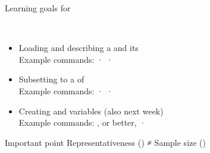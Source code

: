 \documentclass[t]{beamer}
\begin{document}
   \begin{frame}[t]{Learning goals for }

     \\[1em]

		\begin{itemize}
			\item Loading and describing a  and its \\[.5em]%
        Example commands:  ·  · \\[.5em]%
			\item Subsetting to a  of \\[.5em]%
        Example commands:  ·  · \\[.5em]%
			\item Creating and  variables (also next week)\\[.5em]%
        Example commands: , or better,  · \\[.5em]%
		\end{itemize}

      \begin{alertblock}{Important point}
         Representativeness () ≠ Sample size ()
      \end{alertblock}

  \end{frame}
  
\end{document}
